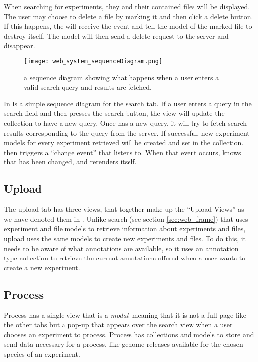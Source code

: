 \begin{example}
When searching for experiments, they and their contained files will be displayed. The user may choose to delete a file by marking it and then click a delete button. If this happens, the  will receive the event and tell the model of the marked file to destroy itself. The model will then send a delete request to the server and disappear.
\end{example}

 
\begin{figure}[h]
\centering
\texttt{[image: web\_system\_sequenceDiagram.png]}
\caption{\label{fig:web_system_sequenceDiagram}a sequence diagram showing what happens when a user enters a valid search query and results are fetched.}
\end{figure}

In  is a simple sequence diagram for the search tab. If a user enters a query in the search field and then presses the search button, the  view will update the  collection to have a new query. Once  has a new query, it will try to fetch search results corresponding to the query from the server. If successful, new experiment models for every experiment retrieved will be created and set in the  collection.  then triggers a ``change event'' that  listens to. When that event occurs,  knows that  has been changed, and rerenders itself.

\subsection{Upload}
The upload tab has three views, that together make up the ``Upload Views'' as we have denoted them in . Unlike search (see section \ref{sec:web_frame}) that uses experiment and file models to retrieve information about experiments and files, upload uses the same models to create new experiments and files. To do this, it needs to be aware of what annotations are available, so it uses an annotation type collection to retrieve the current annotations offered when a user wants to create a new experiment.

\subsection{Process}
Process has a single view that is a \textit{modal}, meaning that it is not a full page like the other tabs but a pop-up that appears over the search view when a user chooses an experiment to process. Process has collections and models to store and send data necessary for a process, like genome releases available for the chosen species of an experiment.   